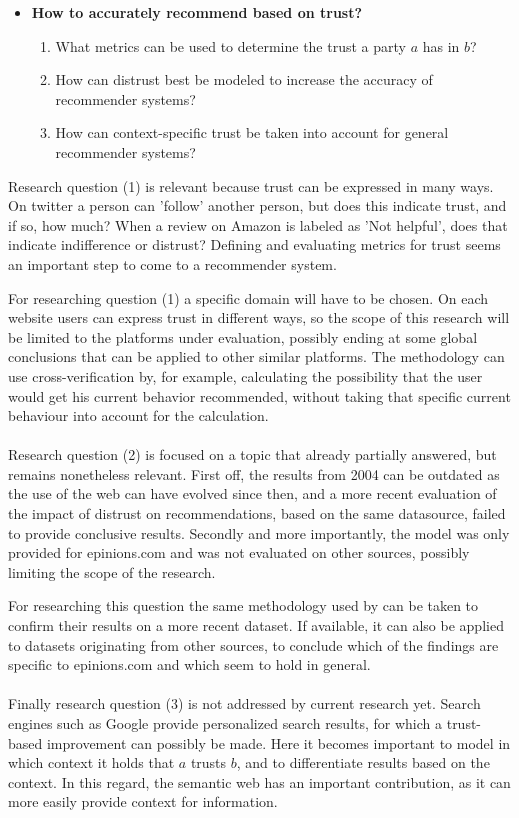 \documentclass{llncs}
\begin{document}
\begin{itemize}
\item \textbf{How to accurately recommend based on trust?}
	\begin{enumerate}
	\item What metrics can be used to determine the trust a party $a$ has in $b$?
	\item How can distrust best be modeled to increase the accuracy of recommender systems?
	\item How can context-specific trust be taken into account for general recommender systems?
	\end{enumerate}
\end{itemize}

Research question (1) is relevant because trust can be expressed in many ways. On twitter a person can 'follow' another person, but does this indicate trust, and if so, how much? When a review on Amazon is labeled as 'Not helpful', does that indicate indifference or distrust? Defining and evaluating metrics for trust seems an important step to come to a recommender system.

For researching question (1) a specific domain will have to be chosen. On each website users can express trust in different ways, so the scope of this research will be limited to the platforms under evaluation, possibly ending at some global conclusions that can be applied to other similar platforms. The methodology can use cross-verification by, for example, calculating the possibility that the user would get his current behavior recommended, without taking that specific current behaviour into account for the calculation.\\
\\
Research question (2) is focused on a topic that \cite{Guha2004} already partially answered, but remains nonetheless relevant. First off, the results from 2004 can be outdated as the use of the web can have evolved since then, and a more recent evaluation of the impact of distrust on recommendations, based on the same datasource, failed to provide conclusive results.\cite{Victor2011} Secondly and more importantly, the model was only provided for epinions.com and was not evaluated on other sources, possibly limiting the scope of the research.

For researching this question the same methodology used by \cite{Guha2004} can be taken to confirm their results on a more recent dataset. If available, it can also be applied to datasets originating from other sources, to conclude which of the findings are specific to epinions.com and which seem to hold in general.\\
\\
Finally research question (3) is not addressed by current research yet. Search engines such as Google provide personalized search results, for which a trust-based improvement can possibly be made. Here it becomes important to model in which context it holds that $a$ trusts $b$, and to differentiate results based on the context. In this regard, the semantic web has an important contribution, as it can more easily provide context for information. 
\end{document}
